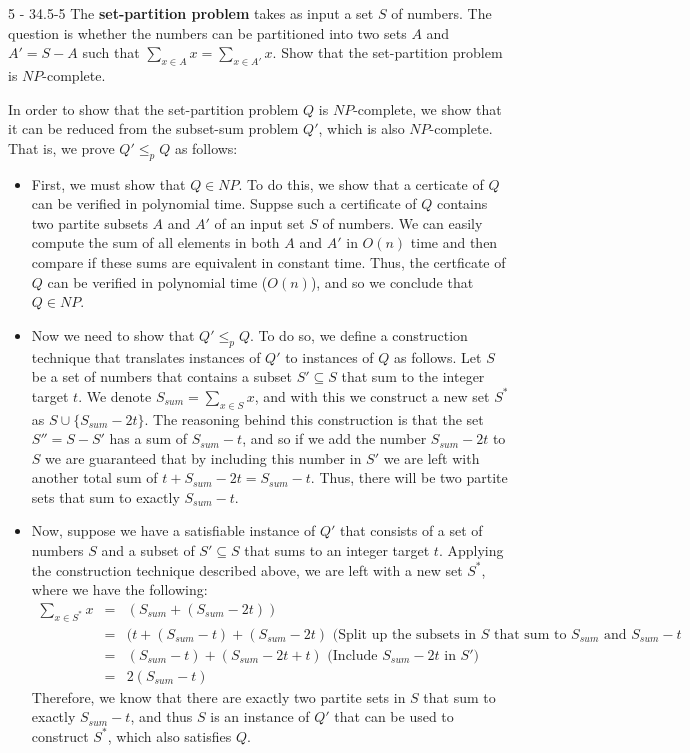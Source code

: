 \documentclass[11pt]{article}
\begin{document}
\begin{prob}{5 - 34.5-5}
The \textbf{set-partition problem} takes as input a set $S$ of numbers. The question is whether the numbers can be partitioned into two sets $A$ and $A' = S - A$ such that $\sum_{x \in A}x = \sum_{x \in A'} x$. Show that the set-partition problem is $NP$-complete.
\end{prob}
\begin{sol}
In order to show that the set-partition problem $Q$ is $NP$-complete, we show that it can be reduced from the subset-sum problem $Q'$, which is also $NP$-complete. That is, we prove $Q' \leq_p Q$ as follows:


\begin{itemize}
	\item First, we must show that $Q \in NP$. To do this, we show that a certicate of $Q$ can be verified in polynomial time. Suppse such a certificate of $Q$ contains two partite subsets $A$ and $A'$ of an input set $S$ of numbers. We can easily compute the sum of all elements in both $A$ and $A'$ in $O(n)$ time and then compare if these sums are equivalent in constant time. Thus, the certficate of $Q$ can be verified in polynomial time ($O(n)$), and so we conclude that $Q \in NP$. 

	\item Now we need to show that $Q' \leq_p Q$. To do so, we define a construction technique that translates instances of $Q'$ to instances of $Q$ as follows. Let $S$ be a set of numbers that contains a subset $S' \subseteq S$ that sum to the integer target $t$. We denote $S_{sum} = \sum_{x \in S}x$, and with this we construct a new set $S^*$ as $S \cup \{S_{sum} - 2t\}$. The reasoning behind this construction is that the set $S'' = S - S'$ has a sum of $S_{sum}- t$, and so if we add the number $S_{sum} - 2t$ to $S$ we are guaranteed that by including this number in $S'$ we are left with another total sum of $t + S_{sum} - 2t = S_{sum} - t$. Thus, there will be two partite sets that sum to exactly $S_{sum} - t$.

	\item Now, suppose we have a satisfiable instance of $Q'$ that consists of a set of numbers $S$ and a subset of $S' \subseteq S$ that sums to an integer target $t$. Applying the construction technique described above, we are left with a new set $S^*$, where we have the following:
\begin{eqnarray*}
\sum_{x \in S^*}x &=& (S_{sum} + (S_{sum} - 2t))\\
& = & (t + (S_{sum} - t) + (S_{sum} - 2t) \text{ (Split up the subsets in $S$ that sum to $S_{sum}$ and $S_{sum} - t$}\\
& = & (S_{sum} - t) + (S_{sum} - 2t + t) \text{ (Include $S_{sum} - 2t$ in $S'$)}\\
& = & 2(S_{sum} - t)
\end{eqnarray*}
Therefore, we know that there are exactly two partite sets in $S$ that sum to exactly $S_{sum} - t$, and thus $S$ is an instance of $Q'$ that can be used to construct $S^*$, which also satisfies $Q$.


\end{itemize}
\end{sol}
\end{document}
